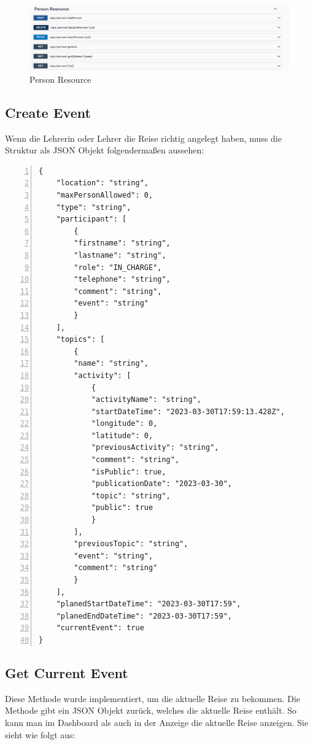\begin{figure}[h]
    \centering
    \includegraphics[scale=0.3]{pics/person_resource.png}
    \caption{Person Resource}
    \label{lst:person_resource}
\end{figure}

\subsection{Create Event}
 Wenn die Lehrerin oder Lehrer die Reise richtig angelegt haben, muss die  Struktur als JSON Objekt folgendermaßen aussehen:

\begin{lstlisting}[numbers=left, label={lst:json_post}]
{
    "location": "string",
    "maxPersonAllowed": 0,
    "type": "string",
    "participant": [
        {
        "firstname": "string",
        "lastname": "string",
        "role": "IN_CHARGE",
        "telephone": "string",
        "comment": "string",
        "event": "string"
        }
    ],
    "topics": [
        {
        "name": "string",
        "activity": [
            {
            "activityName": "string",
            "startDateTime": "2023-03-30T17:59:13.428Z",
            "longitude": 0,
            "latitude": 0,
            "previousActivity": "string",
            "comment": "string",
            "isPublic": true,
            "publicationDate": "2023-03-30",
            "topic": "string",
            "public": true
            }
        ],
        "previousTopic": "string",
        "event": "string",
        "comment": "string"
        }
    ],
    "planedStartDateTime": "2023-03-30T17:59",
    "planedEndDateTime": "2023-03-30T17:59",
    "currentEvent": true
}
\end{lstlisting}


\newpage

\subsection{Get Current Event}

Diese Methode wurde implementiert, um die aktuelle Reise zu bekommen. Die Methode gibt ein JSON Objekt zurück, welches die aktuelle Reise enthält. So kann man im Dashboard als auch in der Anzeige die aktuelle Reise anzeigen. Sie sieht wie folgt aus:


